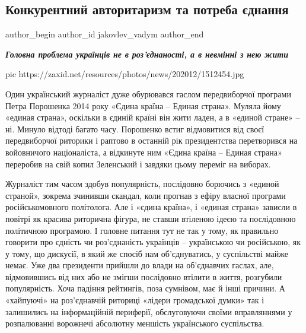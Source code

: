  
 
 
 
 
 
\subsection{Конкурентний авторитаризм та потреба єднання}
\label{sec:28_12_2020.news.ua.zaxid_net.jakovlev_vadym.1.potreba_jednannja}
\ifcmt
	author_begin
   author_id jakovlev_vadym
	author_end
\fi
{}

\begin{leftbar}
  \begingroup
    \em\Large\bfseries\color{blue}
    Головна проблема українців не в роз’єднаності, а в невмінні з нею жити
  \endgroup
\end{leftbar}


\ifcmt
  pic https://zaxid.net/resources/photos/news/202012/1512454.jpg
\fi


Один український журналіст дуже обурювався гаслом передвиборчої програми Петра
Порошенка 2014 року «Єдина країна – Единая страна». Муляла йому «единая
страна», оскільки в єдиній країні він жити ладен, а в «единой стране» – ні.
Минуло відтоді багато часу. Порошенко встиг відмовитися від своєї передвиборчої
риторики і раптово в останній рік президентства перетворився на войовничого
націоналіста, а відкинуте ним «Єдина країна – Единая страна» переробив на свій
копил Зеленський і завдяки цьому переміг на виборах.

Журналіст тим часом здобув популярність, послідовно борючись з «единой
страной», зокрема зчинивши скандал, коли прогнав з ефіру власної програми
російськомовного політолога. Але і «єдина країна», і «единая страна» зависли в
повітрі як красива риторична фігура, не ставши втіленою ідеєю та послідовною
політичною програмою. І головне питання тут не так у тому, як правильно
говорити про єдність чи роз’єднаність українців – українською чи російською, як
у тому, що дискусії, в який же спосіб нам об'єднуватись, у суспільстві майже
немає. Уже два президенти прийшли до влади на об'єднавчих гаслах, але,
відмовившись від них або не змігши послідовно втілити в життя, розгубили
популярність. Хоча падіння рейтингів, поза сумнівом, має й інші причини. А
«хайпуючі» на роз'єднавчій риториці «лідери громадської думки» так і залишились
на інформаційній периферії, обслуговуючи своїми вправляннями у розпалюванні
ворожнечі абсолютну меншість українського суспільства.

